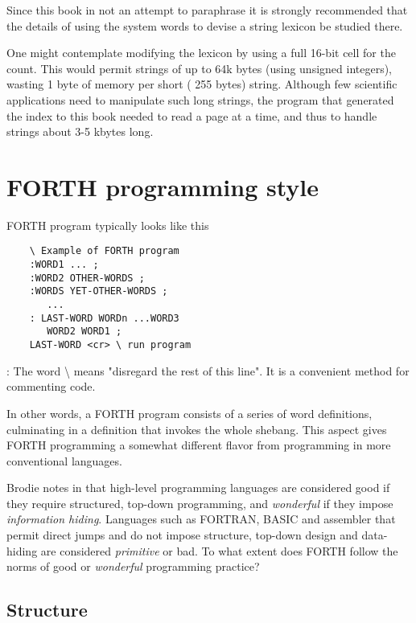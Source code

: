 Since this book in not an attempt to paraphrase \FTR it is strongly recommended that the details of using the system words to devise a string lexicon be studied there.

\leftbar[1\linewidth]
One might contemplate modifying the \FTR lexicon by using a full 16-bit cell for the count. This would permit strings of up to 64k bytes (using unsigned integers\footnotemark), wasting 1 byte of memory per short ( 255 bytes) string. Although few scientific applications need to manipulate such long strings, the program that generated the index to this book needed to read a page at a time, and thus to handle strings about 3-5 kbytes long.
\endleftbar
{}

\section{FORTH programming style}

 FORTH program typically looks like this
\begin{lstlisting}
    \ Example of FORTH program
    :WORD1 ... ;
    :WORD2 OTHER-WORDS ;
    :WORDS YET-OTHER-WORDS ;
       ...
    : LAST-WORD WORDn ...WORD3
       WORD2 WORD1 ;
    LAST-WORD <cr> \ run program
\end{lstlisting}

\leftbar[1\linewidth]
\Note: The word {\textbackslash } means "disregard the rest of this line". It is a convenient method for commenting code.
\endleftbar

In other words, a FORTH program consists of a series of word definitions, culminating in a definition that invokes the whole shebang. This aspect gives FORTH programming a somewhat different ﬂavor from programming in more conventional languages.

Brodie notes in \TF that high-level programming languages are considered good if they require structured, top-down programming, and \textit{wonderful} if they impose \textit{information hiding}. Languages such as FORTRAN, BASIC and assembler that permit direct jumps and do not impose structure, top-down design and data-hiding are considered \textit{primitive} or bad. To what extent does FORTH follow the norms of good or \textit{wonderful} programming practice?

\subsection{Structure}


